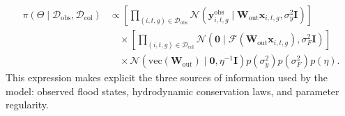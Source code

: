 \documentclass[pdflatex,sn-mathphys-ay]{sn-jnl}
\theoremstyle{thmstyleone}
\theoremstyle{thmstylethree}
\theoremstyle{thmstyletwo}
\begin{document}
\begin{align}
  \pi
  \left(
    \Theta
    \mid
    \mathcal{D}_{\mathrm{obs}},
    \mathcal{D}_{\mathrm{col}}
  \right)
  &\propto
  \left[
    \prod_{(i,t,g)\in\mathcal{D}_{\mathrm{obs}}}
    \mathcal{N}
    \left(
      \mathbf{y}^{\mathrm{obs}}_{i,t,g}
      \mid
      \mathbf{W}_{\mathrm{out}}\mathbf{x}_{i,t,g},
      \sigma^{2}_{y}\mathbf{I}
    \right)
  \right]
  \nonumber \\
  &\quad\times
  \left[
    \prod_{(i,t,g)\in\mathcal{D}_{\mathrm{col}}}
    \mathcal{N}
    \left(
      \mathbf{0}
      \mid
      \mathcal{F}
      \left(
        \mathbf{W}_{\mathrm{out}}\mathbf{x}_{i,t,g}
      \right),
      \sigma^{2}_{F}\mathbf{I}
    \right)
  \right]
  \nonumber \\
  &\quad\times
  \mathcal{N}
  \left(
    \mathrm{vec}
    \left(
      \mathbf{W}_{\mathrm{out}}
    \right)
    \mid
    \mathbf{0},
    \eta^{-1}\mathbf{I}
  \right)
  p
  \left(
    \sigma^{2}_{y}
  \right)
  p
  \left(
    \sigma^{2}_{F}
  \right)
  p(\eta).
  \label{eq:padr_joint_density}
\end{align}
This expression makes explicit the three sources of information used
by the model: observed flood states, hydrodynamic conservation laws,
and parameter regularity.
\end{document}
